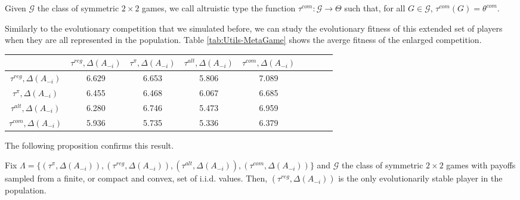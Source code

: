 \documentclass[fleqn,reqno,11pt]{article}
\begin{document}
\begin{definition} \label{defn:comtype}

Given $ \mathcal{G} $ the class of symmetric $ 2 \times 2 $ games, we call altruistic type the function $\tau^{com}: \mathcal{G} \rightarrow  \Theta$ such that, for all $G \in \mathcal{G}$, $ \tau^{com}(G)= \theta^{com}$.

\end{definition}

Similarly to the evolutionary competition that we simulated before, we can study the evolutionary fitness of this extended set of players when they are all represented in the population. Table \ref{tab:Utils-MetaGame} shows the averge fitness of the enlarged competition. 



\begin{table*}[ht]
\centering
\begin{tabular}{ccccccccc}
  \hline
 & $\tau^{reg}, \Delta(A_{-i})$ 
 & $\tau^{\pi}, \Delta(A_{-i})$ 
 & $\tau^{alt}, \Delta(A_{-i})$
 & $\tau^{com}, \Delta(A_{-i})$ \\ 
  \hline
  $\tau^{reg}, \Delta(A_{-i})$ & 6.629 & 6.653 & 5.806 & 7.089  \\ 
  $\tau^{\pi}, \Delta(A_{-i})$  & 6.455 & 6.468 & 6.067 & 6.685  \\ 
  $\tau^{alt}, \Delta(A_{-i})$ & 6.280 & 6.746 & 5.473 & 6.959 \\ 
  $\tau^{com}, \Delta(A_{-i})$ & 5.936 & 5.735 & 5.336 & 6.379  \\ 
   \hline
\end{tabular}
\caption{Average evolutionary fitness in simulations of 5000 symmetric $2 \times 2$ games}
\label{tab:Utils-MetaGame}
\end{table*}

The following proposition confirms this result.

\begin{proposition} \label{proposition2}

Fix $\Lambda = \lbrace (\tau^{\pi}, \Delta(A_{-i})), (\tau^{reg}, \Delta(A_{-i})), (\tau^{alt}, \Delta(A_{-i})), (\tau^{com}, \Delta(A_{-i})) \rbrace$ and $\mathcal{G}$ the class of symmetric $2 \times 2$ games with payoffs sampled from a finite, or compact and convex, set of i.i.d. values. Then, $(\tau^{reg}, \Delta(A_{-i}))$ is the only evolutionarily stable player in the population.

\end{proposition}
\end{document}
